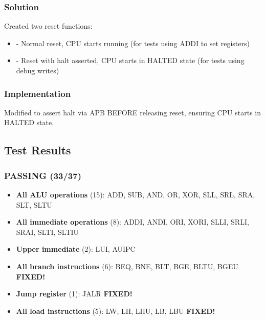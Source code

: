 \subsubsection{Solution}\label{cr:fix:test-fix-summary:solution}

\begin{record}

Created two reset functions:

\begin{itemize}
\tightlist
\item
   - Normal reset, CPU starts running (for tests using
  ADDI to set registers)
\item
   - Reset with halt asserted, CPU starts in
  HALTED state (for tests using debug writes)
\end{itemize}

\end{record}

\subsubsection{Implementation}\label{cr:fix:test-fix-summary:implementation}

\begin{record}

Modified  to assert halt via APB BEFORE
releasing reset, ensuring CPU starts in HALTED state.

\end{record}

\subsection{Test Results}\label{cr:fix:test-fix-summary:test-results}

\subsubsection{\texorpdfstring{PASSING (33/37) \ok{}}{PASSING (33/37) }}\label{cr:fix:test-fix-summary:passing-3337-white-check-mark}

\begin{record}

\begin{itemize}
\tightlist
\item
  \textbf{All ALU operations} (15): ADD, SUB, AND, OR, XOR, SLL, SRL,
  SRA, SLT, SLTU
\item
  \textbf{All immediate operations} (8): ADDI, ANDI, ORI, XORI, SLLI,
  SRLI, SRAI, SLTI, SLTIU
\item
  \textbf{Upper immediate} (2): LUI, AUIPC
\item
  \textbf{All branch instructions} (6): BEQ, BNE, BLT, BGE, BLTU, BGEU
  \ok{} \textbf{FIXED!}
\item
  \textbf{Jump register} (1): JALR \ok{} \textbf{FIXED!}
\item
  \textbf{All load instructions} (5): LW, LH, LHU, LB, LBU \ok{}
  \textbf{FIXED!}
\end{itemize}

\end{record}

